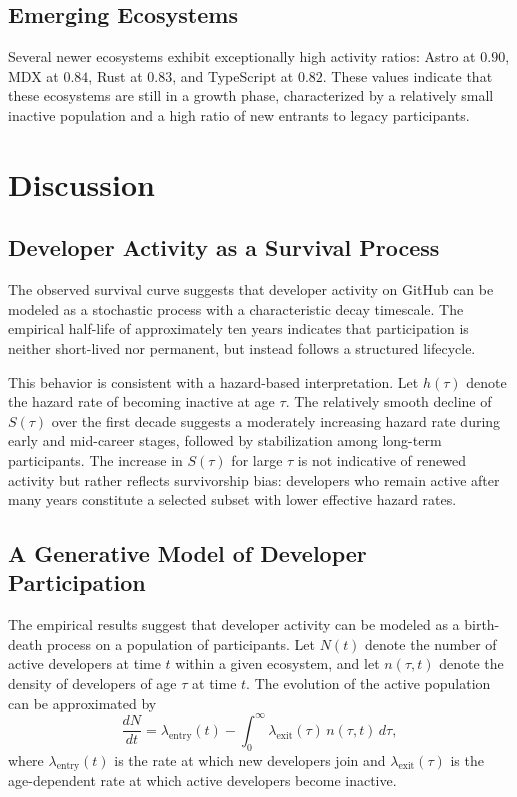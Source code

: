 \documentclass[12pt,a4paper]{article}
\begin{document}
\subsection{Emerging Ecosystems}

Several newer ecosystems exhibit exceptionally high activity ratios: Astro at $0.90$, MDX at $0.84$, Rust at $0.83$, and TypeScript at $0.82$. These values indicate that these ecosystems are still in a growth phase, characterized by a relatively small inactive population and a high ratio of new entrants to legacy participants.

\section{Discussion}

\subsection{Developer Activity as a Survival Process}

The observed survival curve suggests that developer activity on GitHub can be modeled as a stochastic process with a characteristic decay timescale. The empirical half-life of approximately ten years indicates that participation is neither short-lived nor permanent, but instead follows a structured lifecycle.

This behavior is consistent with a hazard-based interpretation. Let $h(\tau)$ denote the hazard rate of becoming inactive at age $\tau$. The relatively smooth decline of $S(\tau)$ over the first decade suggests a moderately increasing hazard rate during early and mid-career stages, followed by stabilization among long-term participants. The increase in $S(\tau)$ for large $\tau$ is not indicative of renewed activity but rather reflects survivorship bias: developers who remain active after many years constitute a selected subset with lower effective hazard rates.

\subsection{A Generative Model of Developer Participation}

The empirical results suggest that developer activity can be modeled as a birth-death process on a population of participants. Let $N(t)$ denote the number of active developers at time $t$ within a given ecosystem, and let $n(\tau, t)$ denote the density of developers of age $\tau$ at time $t$. The evolution of the active population can be approximated by
\[
\frac{dN}{dt} = \lambda_{\text{entry}}(t) - \int_0^\infty \lambda_{\text{exit}}(\tau)\, n(\tau, t)\, d\tau,
\]
where $\lambda_{\text{entry}}(t)$ is the rate at which new developers join and $\lambda_{\text{exit}}(\tau)$ is the age-dependent rate at which active developers become inactive.
\end{document}
